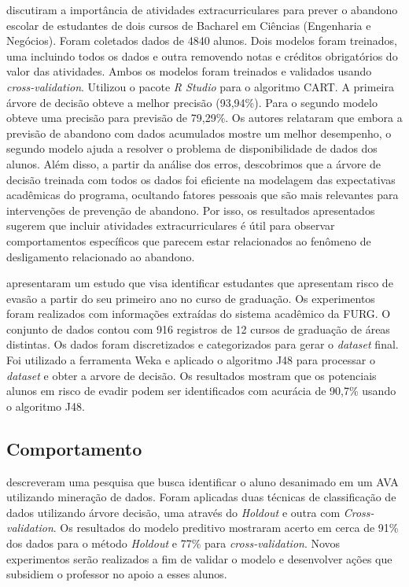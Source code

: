 \documentclass[ti]{texufpel} %
\begin{document}
\citet{hasbun2016extracurricular}  discutiram a importância de atividades extracurriculares para prever o abandono escolar de estudantes de dois cursos de Bacharel em Ciências (Engenharia e Negócios). Foram coletados dados de 4840 alunos. Dois modelos foram treinados, uma incluindo todos os dados e outra removendo notas e créditos obrigatórios do valor das atividades. Ambos os modelos foram treinados e validados usando \textit{cross-validation}. Utilizou o pacote \textit{R Studio} para o algoritmo CART. A primeira árvore de decisão obteve a melhor precisão (93,94\%).  Para o segundo modelo obteve uma precisão para previsão de 79,29\%. Os autores relataram que embora a previsão de abandono com dados acumulados mostre um melhor desempenho, o segundo modelo ajuda a resolver o problema de disponibilidade de dados dos alunos. Além disso, a partir da análise dos erros, descobrimos que a árvore de decisão treinada com todos os dados foi eficiente na modelagem das expectativas acadêmicas do programa, ocultando fatores pessoais que são mais relevantes para intervenções de prevenção de abandono. Por isso, os resultados apresentados sugerem que incluir atividades extracurriculares é útil para observar comportamentos específicos que parecem estar relacionados ao fenômeno de desligamento relacionado ao abandono.


\citet{lanes2018prediccao} apresentaram um estudo que visa identificar estudantes que apresentam risco de evasão a partir do seu primeiro ano no curso de graduação. Os experimentos foram realizados com informações extraídas do sistema acadêmico da FURG. O conjunto de dados contou com 916 registros de 12 cursos de graduação de áreas distintas. Os dados foram discretizados e categorizados para gerar o \textit{dataset} final. Foi utilizado a ferramenta Weka e aplicado o algoritmo J48 para processar o \textit{dataset} e obter a arvore de decisão. Os resultados mostram que os potenciais alunos em risco de evadir podem ser identificados com acurácia de 90,7\% usando o algoritmo J48.

\subsection{Comportamento}


\citet{santos13evidencia} descreveram uma pesquisa que busca identificar o aluno desanimado em um AVA utilizando mineração de dados. Foram aplicadas duas técnicas de classificação de dados utilizando árvore decisão, uma através do \textit{Holdout} e outra com \textit{Cross-validation}. Os resultados do modelo preditivo mostraram acerto em cerca de 91\% dos dados para o método \textit{Holdout} e 77\% para \textit{cross-validation}. Novos experimentos serão realizados a fim de validar o modelo e desenvolver ações que subsidiem o professor no apoio a esses alunos.
\end{document}
